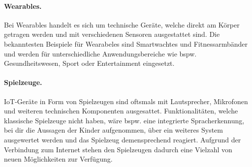 \paragraph{Wearables.}
Bei Wearables handelt es sich um technische Geräte, welche direkt am Körper getragen werden und mit verschiedenen 
Sensoren ausgestattet sind. Die bekanntesten Beispiele für Wearabeles sind Smartwachtes und Fitnessarmbänder und 
werden für unterschiedliche Anwendungsbereiche wie bspw. Gesundheitswesen, Sport oder Entertainment eingesetzt. \cite{paper}

\paragraph{Spielzeuge.}
IoT-Geräte in Form von Spielzeugen sind oftsmals mit Lautsprecher, Mikrofonen und weiteren technischen Komponenten ausgesattet.
Funktionalitäten, welche klassische Spielzeuge nicht haben, wäre bspw. eine integrierte
Spracherkennung, bei dir die Aussagen der Kinder aufgenommen, über ein weiteres System ausgewertet werden und das Spielzeug
demensprechend reagiert. Aufgrund der Verbindung zum Internet stehen den Spielzeugen dadurch eine Vielzahl von neuen Möglichkeiten
zur Verfügung. \cite{paper}
